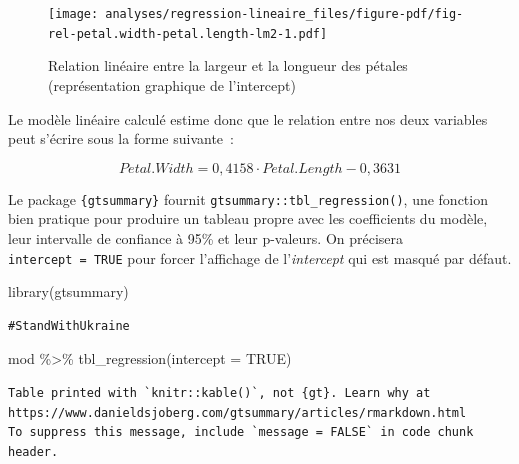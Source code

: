 \documentclass[
  letterpaper,
  DIV=11,
  numbers=noendperiod,
  oneside]{scrreprt}
\newenvironment{Shaded}{\begin{snugshade}}{\end{snugshade}}
\newcommand{\AttributeTok}[1]{\textcolor[rgb]{0.40,0.45,0.13}{#1}}
\newcommand{\ConstantTok}[1]{\textcolor[rgb]{0.56,0.35,0.01}{#1}}
\newcommand{\FunctionTok}[1]{\textcolor[rgb]{0.28,0.35,0.67}{#1}}
\newcommand{\NormalTok}[1]{\textcolor[rgb]{0.00,0.23,0.31}{#1}}
\newcommand{\SpecialCharTok}[1]{\textcolor[rgb]{0.37,0.37,0.37}{#1}}
\begin{document}
\begin{figure}[H]

{\centering \texttt{[image: analyses/regression-lineaire\_files/figure-pdf/fig-rel-petal.width-petal.length-lm2-1.pdf]}

}

\caption{\label{fig-rel-petal.width-petal.length-lm2}Relation linéaire
entre la largeur et la longueur des pétales (représentation graphique de
l'intercept)}

\end{figure}

Le modèle linéaire calculé estime donc que le relation entre nos deux
variables peut s'écrire sous la forme suivante~:

\[
Petal.Width = 0,4158 \cdot Petal.Length - 0,3631
\]

Le package \texttt{\{gtsummary\}} fournit
\texttt{gtsummary::tbl\_regression()}, une fonction bien pratique pour
produire un tableau propre avec les coefficients du modèle, leur
intervalle de confiance à 95\% et leur p-valeurs. On précisera
\texttt{intercept\ =\ TRUE} pour forcer l'affichage de
l'\emph{intercept} qui est masqué par défaut.

\begin{Shaded}
\begin{Highlighting}[]
\FunctionTok{library}\NormalTok{(gtsummary)}
\end{Highlighting}
\end{Shaded}

\begin{verbatim}
#StandWithUkraine
\end{verbatim}

\begin{Shaded}
\begin{Highlighting}[]
\NormalTok{mod }\SpecialCharTok{\%\textgreater{}\%}
  \FunctionTok{tbl\_regression}\NormalTok{(}\AttributeTok{intercept =} \ConstantTok{TRUE}\NormalTok{)}
\end{Highlighting}
\end{Shaded}

\begin{verbatim}
Table printed with `knitr::kable()`, not {gt}. Learn why at
https://www.danieldsjoberg.com/gtsummary/articles/rmarkdown.html
To suppress this message, include `message = FALSE` in code chunk header.
\end{verbatim}
\end{document}
